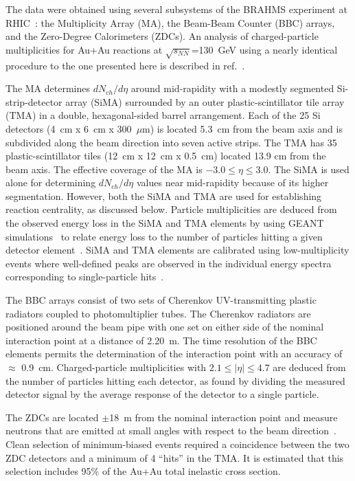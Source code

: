 \documentclass[preprint,showpacs,preprintnumbers,amsmath,amssymb]{revtex4}
\begin{document}
The data were obtained using several subsystems of the  
BRAHMS experiment at RHIC~\cite{bearden01b}: 
the Multiplicity Array (MA), the
Beam-Beam Counter (BBC) arrays, and the Zero-Degree Calorimeters
(ZDCs).  An analysis of
charged-particle multiplicities for Au+Au reactions at
$\sqrt{s_{NN}}$=130~GeV using a nearly identical procedure 
to the one presented here is described in ref.~\cite{bearden01a}. 

The MA determines $dN_{ch}/d\eta$ around mid-rapidity 
with a modestly segmented Si-strip-detector array (SiMA) 
surrounded by an outer
plastic-scintillator tile array (TMA) in 
a double, hexagonal-sided barrel arrangement.   
Each of the 25 Si detectors (4~cm x 6~cm x 300~$\mu$m) is located 5.3~cm from
the beam axis and is subdivided along the beam direction
into seven active strips. The TMA 
has 35 plastic-scintillator tiles (12~cm x 12~cm x 0.5~cm) 
located 13.9 cm from the beam axis.  The effective coverage of the MA is
$-3.0\le\eta\le3.0$. 
The SiMA 
is used alone for determining $dN_{ch}/d\eta$ values near mid-rapidity
because of its higher segmentation.
However, both the SiMA and TMA are
used for establishing reaction centrality, as discussed below.  
Particle multiplicities are deduced from the observed
energy loss in the SiMA and TMA
elements by using GEANT simulations~\cite{Geant} 
to relate energy loss to the number of particles hitting
a given detector element~\cite{bearden01a}. 
SiMA and TMA elements are calibrated using
low-multiplicity events where well-defined peaks are observed
in the individual energy spectra corresponding to
single-particle hits~\cite{bearden01a}. 

The BBC arrays consist of two sets of Cherenkov UV-transmitting
plastic radiators coupled to photomultiplier tubes. The
Cherenkov radiators are
positioned around the beam pipe with one set 
on either side of the nominal
interaction point at a distance of 2.20~m.  The time resolution of the
BBC elements permits the determination of the interaction point with an
accuracy of $\approx$ 0.9~cm.  Charged-particle multiplicities with 
$2.1\le |\eta| \le 4.7$ are deduced from the
number of particles hitting each detector, as found by dividing the
measured detector signal by the average response of the detector
to a single particle.

The ZDCs are located $\pm$18~m from the nominal
interaction point and measure neutrons that are emitted at small
angles with respect to the beam direction~\cite{adler00}.  Clean
selection of minimum-biased events required a coincidence between the two
ZDC detectors and a minimum of 4 ``hits'' in the TMA. It is estimated that
this selection 
includes 95\% of the Au+Au total inelastic cross section. 
\end{document}
